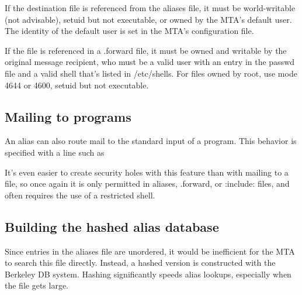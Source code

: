 If the destination file is referenced from the {aliases} file, it must
be world-writable (not advisable), setuid but not executable, or owned
by the MTA's default user. The identity of the default user is set in
the MTA's configuration file.

If the file is referenced in a {.forward} file, it must be owned and
writable by the original message recipient, who must be a valid user
with an entry in the {passwd} file and a valid shell that's listed in
{/etc/shells}. For files owned by root, use mode 4644 or 4600, setuid
but not executable.

\protect\hypertarget{part0026_split_021.html}{}{}

\hypertarget{part0026_split_021.htmlux5cux23_idContainer1247}{}
\hypertarget{part0026_split_021.htmlux5cux23calibre_pb_20}{%
\subsection[Mailing to
programs]{\texorpdfstring{\protect\hypertarget{part0026_split_021.htmlux5cux23_idTextAnchor1034}{}{}Mailing
to
programs}{Mailing to programs}}\label{part0026_split_021.htmlux5cux23calibre_pb_20}}

An alias can also route mail to the standard input of a program. This
behavior is
\protect\hypertarget{part0026_split_021.htmlux5cux23_idIndexMarker2479}{}{}specified
with a line such as


It's even easier to create security holes with this feature than with
mailing to a file, so once again it is only permitted in {aliases},
{.forward}, or {:include:} files, and often requires the use of a
restricted shell.

\protect\hypertarget{part0026_split_022.html}{}{}

\hypertarget{part0026_split_022.htmlux5cux23_idContainer1247}{}
\hypertarget{part0026_split_022.htmlux5cux23calibre_pb_21}{%
\subsection[Building the hashed alias
database]{\texorpdfstring{\protect\hypertarget{part0026_split_022.htmlux5cux23_idTextAnchor1035}{}{}Building
the hashed alias
database}{Building the hashed alias database}}\label{part0026_split_022.htmlux5cux23calibre_pb_21}}

\protect\hypertarget{part0026_split_022.htmlux5cux23_idIndexMarker2480}{}{}Since
entries in the {aliases} file are unordered, it would be inefficient for
the MTA to search this file directly. Instead, a hashed version is
constructed with the Berkeley DB system. Hashing significantly speeds
alias lookups, especially when the file gets large.


